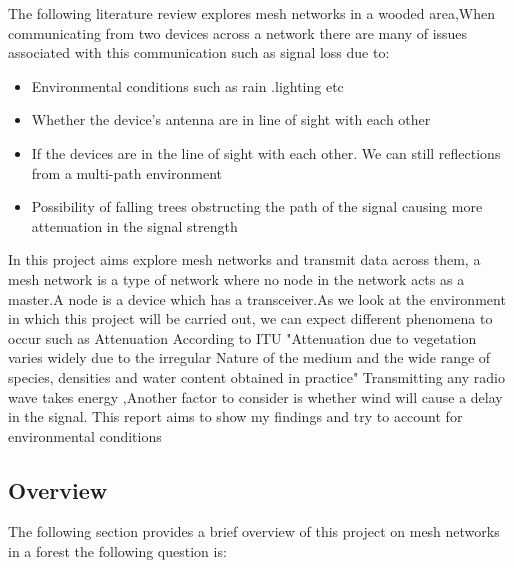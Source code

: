 The following literature review explores mesh networks in a wooded area,When communicating from two devices across a network there are many of issues associated with this communication such as signal loss due to:
	\begin{itemize}
		\item Environmental conditions such as rain .lighting etc
		\item Whether the device's antenna are in line of sight with each other
		\item If the devices are in the line of sight with each other. We can still reflections from a multi-path environment
		\item Possibility of falling trees obstructing the path of the signal causing more attenuation in the signal strength
	\end{itemize}
	In this project aims explore mesh networks and transmit data across them,  a mesh network is a type of network where no node in the network acts as a  master.A node is a device which has a transceiver.As we look at the environment in which this project will be carried out, we can expect different phenomena to occur such as  Attenuation According to ITU \cite{ITU} "Attenuation due to vegetation varies widely due to the irregular Nature of the medium and the wide range of species, densities and water content obtained in practice"
	Transmitting any radio wave takes energy ,Another factor to consider is whether wind will cause a  delay in the signal. This report aims to show my findings and try to account for environmental conditions
	\subsection{Overview} \label{sec: overview}

		The following section provides a brief overview of  this project on mesh networks in a forest the following question is:
		

